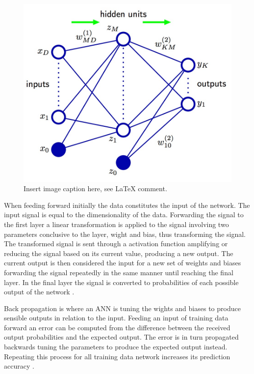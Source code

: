 \begin{figure}[ht!]
  \centering
  \includegraphics[width=\linewidth]{images/ANN_representation.jpg}
  \caption{Insert image caption here, see LaTeX comment.}
  \label{fig:ANN_representation}
\end{figure}


When feeding forward initially the data constitutes the input of the network. The input signal is equal to the dimensionality of the data. Forwarding the signal to the first layer a linear transformation is applied to the signal involving two parameters conclusive to the layer, wight and bias, thus transforming the signal. The transformed signal is sent through a activation function amplifying or reducing the signal based on its current value, producing a new output. The current output is then considered the input for a new set of weights and biases forwarding the signal repeatedly in the same manner until reaching the final layer. In the final layer the signal is converted to probabilities of each possible output of the network \parencite{Bishop:2006}.

Back propagation is where an ANN is tuning the wights and biases to produce sensible outputs in relation to the input. Feeding an input of training data forward an error can be computed from the difference between the received output probabilities and the expected output. The error is in turn propagated backwards tuning the parameters to produce the expected output instead. Repeating this process for all training data network increases its prediction accuracy \parencite{Bishop:2006}.

